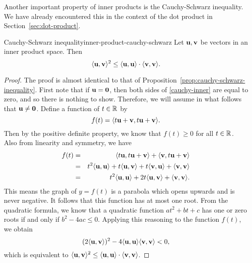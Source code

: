 Another important property of inner products is the Cauchy-Schwarz
inequality. We have already encountered this in the context of the dot
product in Section~\ref{sec:dot-product}.

\begin{theorem}{Cauchy-Schwarz inequality}{inner-product-cauchy-schwarz}
  Let $\vect{u},\vect{v}$ be vectors in an inner product space. Then%
  \begin{equation}\label{cauchy-inner}
    \iprod{\vect{u},\vect{v}}^2
    \leq \iprod{\vect{u},\vect{u}} \cdot \iprod{\vect{v},\vect{v}}.
  \end{equation}
\end{theorem}

\begin{proof}
  The proof is almost identical to that of
  Proposition~\ref{prop:cauchy-schwarz-inequality}.  First note that if
  $\vect{u}=\vect{0}$, then both sides of {\eqref{cauchy-inner}} are
  equal to zero, and so there is nothing to show. Therefore, we will
  assume in what follows that $\vect{u}\neq \vect{0}$.  Define a
  function of $t\in \mathbb{R}$ by
  \begin{equation*}
    f(t) = \iprod{t\vect{u}+\vect{v}, t\vect{u}+ \vect{v}}.
  \end{equation*}
  Then by the positive definite property, we know that $f(t)\geq 0$
  for all $t\in \mathbb{R}$.  Also from linearity and symmetry, we have
  \begin{eqnarray*}
    f(t) &=& \iprod{t\vect{u}, t\vect{u}+\vect{v}} +
             \iprod{\vect{v}, t\vect{u}+\vect{v}} \\
         &=& t^2\iprod{\vect{u}, \vect{u}}+t\iprod{\vect{u}, \vect{v}} + t\iprod{\vect{v}, \vect{u}}+
             \iprod{\vect{v}, \vect{v}} \\
         &=&t^2\iprod{\vect{u},\vect{u}}+2t\iprod{\vect{u}, \vect{v}}
             + \iprod{\vect{v}, \vect{v}}.
  \end{eqnarray*}
  This means the graph of $y=f(t)$ is a parabola which opens upwards
  and is never negative. It follows that this function has at most one
  root. From the quadratic formula, we know that a quadratic function
  $at^2+bt+c$ has one or zero roots if and only if $b^2-4ac\leq
  0$. Applying this reasoning to the function $f(t)$, we obtain
  \begin{equation*}
    (2\iprod{\vect{u}, \vect{v}})^2
    - 4\iprod{\vect{u},\vect{u}}\iprod{\vect{v},\vect{v}} < 0,
  \end{equation*}
  which is equivalent to
  $\iprod{\vect{u},\vect{v}}^2 \leq \iprod{\vect{u},\vect{u}} \cdot
  \iprod{\vect{v},\vect{v}}$.
\end{proof}

